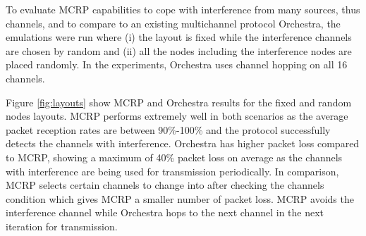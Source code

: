 To evaluate MCRP capabilities to cope with interference from many sources, thus channels, and to compare to an existing multichannel protocol Orchestra, the emulations were run where (i) the layout is fixed while the interference channels are chosen by random and (ii) all the nodes including the interference nodes are placed randomly. 
In the experiments, Orchestra uses channel hopping on all 16 channels.  

Figure \ref{fig:layouts} show MCRP and Orchestra results for the fixed and random nodes layouts.
MCRP performs extremely well in both scenarios as the average packet reception rates are between 90\%-100\% and the protocol successfully detects the channels with interference.
Orchestra has higher packet loss compared to MCRP, showing a maximum of 40\% packet loss on average as the channels with interference are being used for transmission periodically.
In comparison, MCRP selects certain channels to change into after checking the channels condition which gives MCRP a smaller number of packet loss.
MCRP avoids the interference channel while Orchestra hops to the next channel in the next iteration for transmission.



